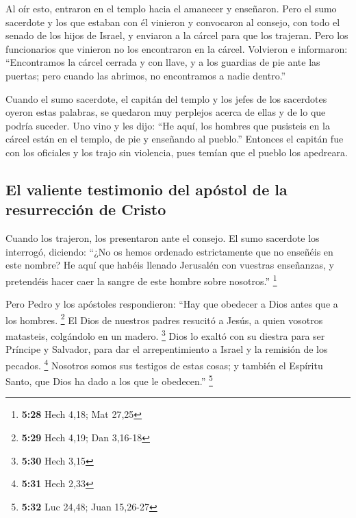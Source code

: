  Al oír esto, entraron en el templo hacia el amanecer y
enseñaron. Pero el sumo sacerdote y los que estaban con él vinieron y
convocaron al consejo, con todo el senado de los hijos de Israel, y
enviaron a la cárcel para que los trajeran.  Pero los
funcionarios que vinieron no los encontraron en la cárcel. Volvieron e
informaron:  ``Encontramos la cárcel cerrada y con llave,
y a los guardias de pie ante las puertas; pero cuando las abrimos, no
encontramos a nadie dentro.''

 Cuando el sumo sacerdote, el capitán del templo y los
jefes de los sacerdotes oyeron estas palabras, se quedaron muy perplejos
acerca de ellas y de lo que podría suceder.  Uno vino y
les dijo: ``He aquí, los hombres que pusisteis en la cárcel están en el
templo, de pie y enseñando al pueblo.''  Entonces el
capitán fue con los oficiales y los trajo sin violencia, pues temían que
el pueblo los apedreara.

\hypertarget{el-valiente-testimonio-del-apuxf3stol-de-la-resurrecciuxf3n-de-cristo}{%
\subsection{El valiente testimonio del apóstol de la resurrección de
Cristo}\label{el-valiente-testimonio-del-apuxf3stol-de-la-resurrecciuxf3n-de-cristo}}

 Cuando los trajeron, los presentaron ante el consejo. El
sumo sacerdote los interrogó,  diciendo: ``¿No os hemos
ordenado estrictamente que no enseñéis en este nombre? He aquí que
habéis llenado Jerusalén con vuestras enseñanzas, y pretendéis hacer
caer la sangre de este hombre sobre nosotros.'' \footnote{\textbf{5:28}
  Hech 4,18; Mat 27,25}

 Pero Pedro y los apóstoles respondieron: ``Hay que
obedecer a Dios antes que a los hombres. \footnote{\textbf{5:29} Hech
  4,19; Dan 3,16-18}  El Dios de nuestros padres resucitó
a Jesús, a quien vosotros matasteis, colgándolo en un madero.
\footnote{\textbf{5:30} Hech 3,15}  Dios lo exaltó con su
diestra para ser Príncipe y Salvador, para dar el arrepentimiento a
Israel y la remisión de los pecados. \footnote{\textbf{5:31} Hech 2,33}
 Nosotros somos sus testigos de estas cosas; y también el
Espíritu Santo, que Dios ha dado a los que le obedecen.'' \footnote{\textbf{5:32}
  Luc 24,48; Juan 15,26-27}

